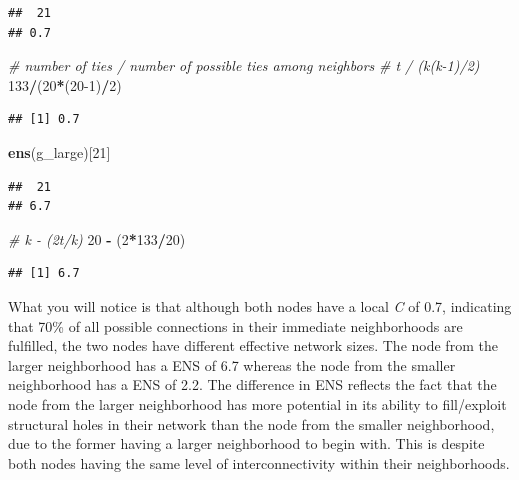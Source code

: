 \documentclass[
]{book}
\newenvironment{Shaded}{\begin{snugshade}}{\end{snugshade}}
\newcommand{\CommentTok}[1]{\textcolor[rgb]{0.56,0.35,0.01}{\textit{#1}}}
\newcommand{\DecValTok}[1]{\textcolor[rgb]{0.00,0.00,0.81}{#1}}
\newcommand{\FunctionTok}[1]{\textcolor[rgb]{0.13,0.29,0.53}{\textbf{#1}}}
\newcommand{\NormalTok}[1]{#1}
\newcommand{\SpecialCharTok}[1]{\textcolor[rgb]{0.81,0.36,0.00}{\textbf{#1}}}
\begin{document}
\begin{verbatim}
##  21 
## 0.7
\end{verbatim}

\begin{Shaded}
\begin{Highlighting}[]
\CommentTok{\# number of ties / number of possible ties among neighbors }
\CommentTok{\# t / (k(k{-}1)/2)}
\DecValTok{133}\SpecialCharTok{/}\NormalTok{(}\DecValTok{20}\SpecialCharTok{*}\NormalTok{(}\DecValTok{20{-}1}\NormalTok{)}\SpecialCharTok{/}\DecValTok{2}\NormalTok{) }
\end{Highlighting}
\end{Shaded}

\begin{verbatim}
## [1] 0.7
\end{verbatim}

\begin{Shaded}
\begin{Highlighting}[]
\FunctionTok{ens}\NormalTok{(g\_large)[}\DecValTok{21}\NormalTok{]}
\end{Highlighting}
\end{Shaded}

\begin{verbatim}
##  21 
## 6.7
\end{verbatim}

\begin{Shaded}
\begin{Highlighting}[]
\CommentTok{\# k {-} (2t/k)}
\DecValTok{20} \SpecialCharTok{{-}}\NormalTok{ (}\DecValTok{2}\SpecialCharTok{*}\DecValTok{133}\SpecialCharTok{/}\DecValTok{20}\NormalTok{)}
\end{Highlighting}
\end{Shaded}

\begin{verbatim}
## [1] 6.7
\end{verbatim}

What you will notice is that although both nodes have a local \emph{C} of 0.7, indicating that 70\% of all possible connections in their immediate neighborhoods are fulfilled, the two nodes have different effective network sizes. The node from the larger neighborhood has a ENS of 6.7 whereas the node from the smaller neighborhood has a ENS of 2.2. The difference in ENS reflects the fact that the node from the larger neighborhood has more potential in its ability to fill/exploit structural holes in their network than the node from the smaller neighborhood, due to the former having a larger neighborhood to begin with. This is despite both nodes having the same level of interconnectivity within their neighborhoods.
\end{document}
